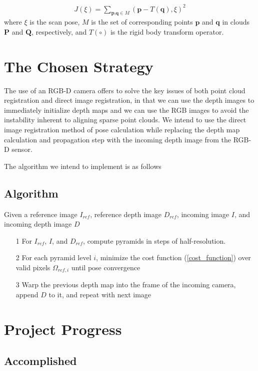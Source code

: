 \documentclass[conference]{IEEEtran}
\begin{document}
\begin{align}
    J(\xi) = \sum_{\textbf{p,q} \in M} (\textbf{p} - T(\textbf{q}), \xi)^2
\end{align}
where $\xi$ is the scan pose, $M$ is the set of corresponding points $\textbf{p}$ and $\textbf{q}$ in clouds $\textbf{P}$ and $\textbf{Q}$, respectively, and $T(\circ)$ is the rigid body transform operator.


\section{The Chosen Strategy}

The use of an RGB-D camera offers to solve the key issues of both point cloud registration and direct image registration, in that we can use the depth images to immediately initialize depth maps and we can use the RGB images to avoid the instability inherent to aligning sparse point clouds.
We intend to use the direct image registration method of pose calculation while replacing the depth map calculation and propagation step with the incoming depth image from the RGB-D sensor.

The algorithm we intend to implement is as follows

\subsection{Algorithm}
Given a reference image $I_{ref}$, reference depth image $D_{ref}$, incoming image $I$, and incoming depth image $D$
\begin{itemize}
    \item[1] For $I_{ref}$, $I$, and $D_{ref}$, compute pyramids in steps of half-resolution.
    \item[2] For each pyramid level $i$, minimize the cost function (\ref{cost_function}) over valid pixels $\Omega_{ref, i}$ until pose convergence
    \item[3] Warp the previous depth map into the frame of the incoming camera, append $D$ to it, and repeat with next image  
\end{itemize}

\section{Project Progress}

\subsection{Accomplished}
\end{document}
